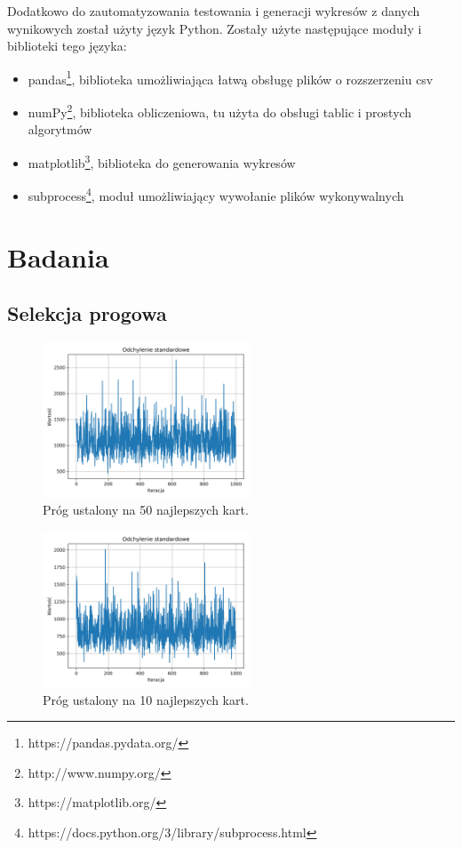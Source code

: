 \documentclass[12pt]{article}
\begin{document}
Dodatkowo do zautomatyzowania testowania i generacji wykresów z danych wynikowych został użyty język Python. Zostały użyte następujące moduły i biblioteki tego języka:

\begin{itemize}
	\item{pandas\footnote{https://pandas.pydata.org/}, biblioteka umożliwiająca łatwą obsługę plików o rozszerzeniu csv}
	\item{numPy\footnote{http://www.numpy.org/}, biblioteka obliczeniowa, tu użyta do obsługi tablic i prostych algorytmów} 
	\item{matplotlib\footnote{https://matplotlib.org/}, biblioteka do generowania wykresów}
	\item{subprocess\footnote{https://docs.python.org/3/library/subprocess.html}, moduł umożliwiający wywołanie plików wykonywalnych} 	
\end{itemize}

\newpage

\section{Badania}
\subsection{Selekcja progowa}

\begin{figure}[h]
	\centering					\includegraphics[width=0.55\textwidth]{threshold_1.png}
	\caption{Próg ustalony na 50 najlepszych kart.}
	\label{fig1}
\end{figure}


\begin{figure}[h]
	\centering					\includegraphics[width=0.55\textwidth]{threshold_2.png}
	\caption{Próg ustalony na 10 najlepszych kart.}
	\label{fig1}
\end{figure}
\end{document}
